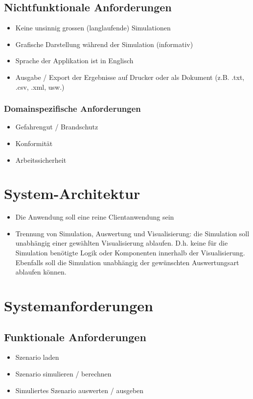 \documentclass[11pt,a4paper]{article}
\begin{document}
\subsection{Nichtfunktionale Anforderungen}
\begin{itemize}
  \item Keine unsinnig grossen (langlaufende) Simulationen
  \item Grafische Darstellung während der Simulation (informativ)
  \item Sprache der Applikation ist in Englisch
  \item Ausgabe / Export der Ergebnisse auf Drucker oder als Dokument (z.B. .txt, .csv, .xml, usw.)
\end{itemize}

%
\subsubsection{Domainspezifische Anforderungen}
\begin{itemize}
  \item Gefahrengut / Brandschutz
  \item Konformität
  \item Arbeitssicherheit
\end{itemize}
%
\section{System-Architektur}
\begin{itemize}
  \item Die Anwendung soll eine reine Clientanwendung sein
  \item Trennung von Simulation, Auswertung und Visualisierung: die Simulation soll unabhängig einer gewählten Visualisierung ablaufen. D.h. keine für die Simulation benötigte Logik oder Komponenten innerhalb der Visualisierung. Ebenfalls soll die Simulation unabhängig der gewünschten Auswertungsart ablaufen können.
\end{itemize}
%
\section{Systemanforderungen}
%
\subsection{Funktionale Anforderungen}
\begin{itemize}
  \item Szenario laden
  \item Szenario simulieren / berechnen
  \item Simuliertes Szenario auswerten / ausgeben
\end{itemize}
%
\end{document}
